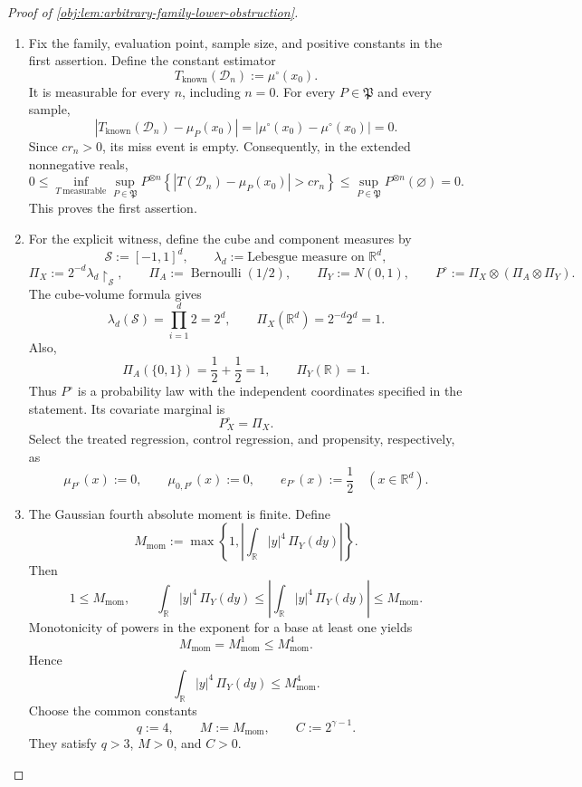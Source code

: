 \documentclass[11pt]{article}
\begin{document}
\begin{proof}[Proof of \cref{obj:lem:arbitrary-family-lower-obstruction}]
\begin{enumerate}
\item Fix the family, evaluation point, sample size, and positive constants in the first assertion. Define the constant estimator
\[
T_{\mathrm{known}}(\mathcal D_n):=\mu^\circ(x_0).
\]
It is measurable for every \(n\), including \(n=0\). For every \(P\in\mathfrak P\) and every sample,
\[
\left|T_{\mathrm{known}}(\mathcal D_n)-\mu_P(x_0)\right|
=\left|\mu^\circ(x_0)-\mu^\circ(x_0)\right|=0.
\]
Since \(c r_n>0\), its miss event is empty. Consequently, in the extended nonnegative reals,
\[
0\le
\inf_{T\ \mathrm{measurable}}\sup_{P\in\mathfrak P}
P^{\otimes n}\!\left\{
|T(\mathcal D_n)-\mu_P(x_0)|>c r_n
\right\}
\le
\sup_{P\in\mathfrak P}P^{\otimes n}(\varnothing)
=0.
\]
This proves the first assertion. %

\item For the explicit witness, define the cube and component measures by
\[
\mathcal S:=[-1,1]^d,\qquad
\lambda_d:=\text{Lebesgue measure on }\mathbb R^d,
\]
\[
\Pi_X:=2^{-d}\lambda_d\!\restriction_{\mathcal S},
\qquad
\Pi_A:=\operatorname{Bernoulli}(1/2),
\qquad
\Pi_Y:=N(0,1),
\qquad
P^\circ:=\Pi_X\otimes(\Pi_A\otimes\Pi_Y).
\]
The cube-volume formula gives
\[
\lambda_d(\mathcal S)=\prod_{i=1}^d 2=2^d,
\qquad
\Pi_X(\mathbb R^d)=2^{-d}2^d=1.
\]
Also,
\[
\Pi_A(\{0,1\})=\frac12+\frac12=1,
\qquad
\Pi_Y(\mathbb R)=1.
\]
Thus \(P^\circ\) is a probability law with the independent coordinates specified in the statement. Its covariate marginal is
\[
P_X^\circ=\Pi_X.
\]
Select the treated regression, control regression, and propensity, respectively, as
\[
\mu_{P^\circ}(x):=0,\qquad
\mu_{0,P^\circ}(x):=0,\qquad
e_{P^\circ}(x):=\frac12
\quad (x\in\mathbb R^d).
\]

\item The Gaussian fourth absolute moment is finite. Define
\[
M_{\mathrm{mom}}
:=
\max\left\{
1,\left|\int_{\mathbb R}|y|^4\,\Pi_Y(dy)\right|
\right\}.
\]
Then
\[
1\le M_{\mathrm{mom}},
\qquad
\int_{\mathbb R}|y|^4\,\Pi_Y(dy)
\le
\left|\int_{\mathbb R}|y|^4\,\Pi_Y(dy)\right|
\le M_{\mathrm{mom}}.
\]
Monotonicity of powers in the exponent for a base at least one yields
\[
M_{\mathrm{mom}}
=M_{\mathrm{mom}}^1
\le M_{\mathrm{mom}}^4.
\]
Hence
\[
\int_{\mathbb R}|y|^4\,\Pi_Y(dy)
\le M_{\mathrm{mom}}^4.
\]
Choose the common constants
\[
q:=4,\qquad M:=M_{\mathrm{mom}},\qquad C:=2^{\gamma-1}.
\]
They satisfy \(q>3\), \(M>0\), and \(C>0\). %


\end{enumerate}
\end{proof}
\end{document}
